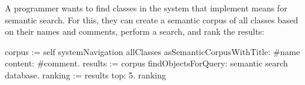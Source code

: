 %
%
%

\begin{example}[5]
	A programmer wants to find classes in the system that implement means for semantic search.
	For this, they can create a semantic corpus of all classes based on their names and comments, perform a search, and rank the results:

	\begin{multicode}
		corpus := self systemNavigation allClasses \newline
		\null\qquad	asSemanticCorpusWithTitle: \#name \newline
		\null\qquad	content: \#comment. \newline
		results := corpus findObjectsForQuery: \textquotesingle semantic search database\textquotesingle. \newline
		ranking := results top: 5. \newline
		ranking 
	\end{multicode}
\end{example}

